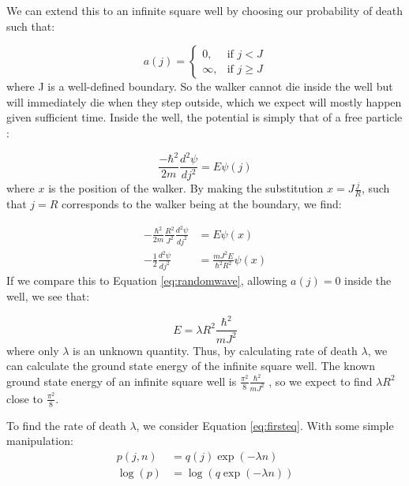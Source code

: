 \documentclass[journal]{IEEEtran}
\begin{document}
We can extend this to an infinite square well by choosing our probability of
death such that:

\begin{equation}
  \label{eq:squarewell}
    a(j) =
    \begin{cases}
      0,& \text{if } j < J\\
      \infty,& \text{if } j \geq J
    \end{cases}
    \nonumber
\end{equation}
where J is a well-defined boundary. So the walker cannot die inside the well but
will immediately die when they step outside, which we expect will mostly
happen given sufficient time. Inside the well, the potential is simply that of a
free particle \cite{Bransden2003}:

\begin{equation}
  \frac{-\hbar^2}{2m}\frac{d^2 \psi}{dj^2} = E\psi(j)
  \nonumber
\end{equation}
where $x$ is the position of the walker. By making the substitution
$x=J\frac{j}{R}$, such that $j=R$ corresponds to the walker being at the
boundary, we find:

\begin{equation}
  \begin{split}
    -\frac{\hbar^2}{2m}\frac{R^2}{J^2}\frac{d^2\psi}{dj^2} &= E\psi(x)\\
    -\frac{1}{2}\frac{d^2\psi}{dj^2} &= \frac{mJ^2E}{\hbar^2R^2}\psi(x)
  \end{split}
  \nonumber
\end{equation}
If we compare this to Equation \ref{eq:randomwave}, allowing $a(j) = 0$ inside
the well, we see that:

\begin{equation}
  E = \lambda R^2 \frac{\hbar^2}{mJ^2}
  \label{eq:kasia}
\end{equation}
where only $\lambda$ is an unknown quantity. Thus, by calculating rate of death
$\lambda$, we can calculate the ground state energy of the infinite square
well. The known ground state energy of an infinite square well is
$\frac{\pi^2}{8}\frac{\hbar^2}{mJ^2}$ \cite{Davies1998}, so we expect to find $\lambda
R^2$ close to $\frac{\pi^2}{8}$.

To find the rate of death $\lambda$, we consider Equation \ref{eq:firsteq}. With
some simple manipulation:
\begin{equation}
  \begin{split}
    p(j, n) & = q(j) \exp(-\lambda n)\\
    \log(p) & = \log(q \exp(-\lambda n)) \\
  \end{split}
  \nonumber
\end{equation}
\end{document}
